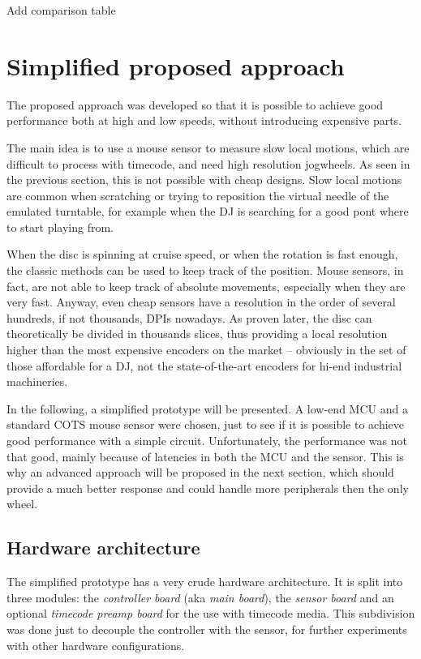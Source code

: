 \documentclass[a4paper,10pt]{article}
\begin{document}
\begin{multicols}{2}
\TODO Add comparison table


\section{Simplified proposed approach}

The proposed approach was developed so that it is possible to achieve good
performance both at high and low speeds, without introducing expensive parts.

The main idea is to use a mouse sensor to measure slow local motions, which
are difficult to process with timecode, and need high resolution jogwheels.
As seen in the previous section, this is not possible with cheap designs.
Slow local motions are common when scratching or trying to reposition the
virtual needle of the emulated turntable, for example when the DJ is searching
for a good pont where to start playing from.

When the disc is spinning at cruise speed, or when the rotation is fast
enough, the classic methods can be used to keep track of the position.
Mouse sensors, in fact, are not able to keep track of absolute movements,
especially when they are very fast. Anyway, even cheap sensors have a
resolution in the order of several hundreds, if not thousands, DPIs nowadays.
As proven later, the disc can theoretically be divided in thousands slices,
thus providing a local resolution higher than the most expensive encoders on
the market -- obviously in the set of those affordable for a DJ, not the
state-of-the-art encoders for hi-end industrial machineries.

In the following, a simplified prototype will be presented. A low-end MCU and
a standard COTS mouse sensor were chosen, just to see if it is possible to
achieve good performance with a simple circuit. Unfortunately, the performance
was not that good, mainly because of latencies in both the MCU and the sensor.
This is why an advanced approach will be proposed in the next section, which
should provide a much better response and could handle more peripherals then
the only wheel.


\subsection{Hardware architecture}

The simplified prototype has a very crude hardware architecture. It is split
into three modules: the \emph{controller board} (aka \emph{main board}), the
\emph{sensor board} and an optional \emph{timecode preamp board} for the use
with timecode media. This subdivision was done just to decouple the controller
with the sensor, for further experiments with other hardware configurations.



\end{multicols}
\end{document}
